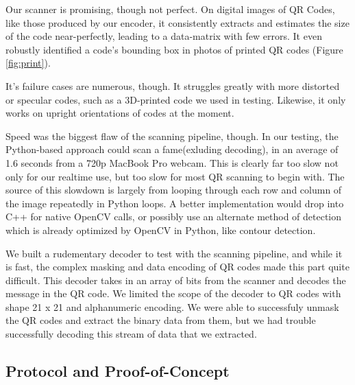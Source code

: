 \documentclass[10pt,twocolumn,letterpaper]{article}
\begin{document}
Our scanner is promising, though not perfect. On digital images of QR Codes, like those produced by our encoder, it consistently extracts and estimates the size of the code near-perfectly, leading to a data-matrix with few errors. It even robustly identified a code's bounding box in photos of printed QR codes (Figure \ref{fig:print}).

It's failure cases are numerous, though. It struggles greatly with more distorted or specular codes, such as a 3D-printed code we used in testing. Likewise, it only works on upright orientations of codes at the moment.

Speed was the biggest flaw of the scanning pipeline, though. In our testing, the Python-based approach could scan a fame(exluding decoding), in an average of 1.6 seconds from a 720p MacBook Pro webcam. This is clearly far too slow not only for our realtime use, but too slow for most QR scanning to begin with. The source of this slowdown is largely from looping through each row and column of the image repeatedly in Python loops. A better implementation would drop into C++ for native OpenCV calls, or possibly use an alternate method of detection which is already optimized by OpenCV in Python, like contour detection.

We built a rudementary decoder to test with the scanning pipeline, and while it is fast, the complex masking and data encoding of QR codes made this part quite difficult. This decoder takes in an array of bits from the scanner and decodes the message in the QR code. We limited the scope of the decoder to QR codes with shape 21 x 21 and alphanumeric encoding. We were able to successfuly unmask the QR codes and extract the binary data from them, but we had trouble successfully decoding this stream of data that we extracted. 

\subsection{Protocol and Proof-of-Concept}
\end{document}
